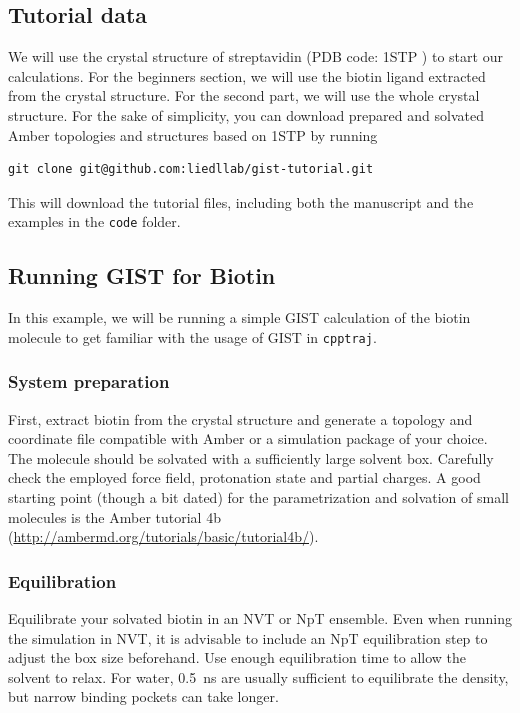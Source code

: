 \documentclass[9pt,tutorial]{livecoms}
\newcommand{\software}{\texttt}
\newcommand\inlinecode{\texttt}
\begin{document}
\subsection{Tutorial data}
We will use the crystal structure of streptavidin (PDB code: 1STP \cite{Weber1989-streptavidin-structure}) to start our calculations.
For the beginners section, we will use the biotin ligand extracted from the crystal structure.
For the second part, we will use the whole crystal structure.
For the sake of simplicity, you can download prepared and solvated Amber topologies and structures based on 1STP by running
\begin{lstlisting}[style=bash]
git clone git@github.com:liedllab/gist-tutorial.git
\end{lstlisting}
This will download the tutorial files, including both the manuscript and the examples in the \inlinecode{code} folder.

\subsection{Running GIST for Biotin}
In this example, we will be running a simple GIST calculation of the biotin molecule to get familiar with the usage of GIST in \software{cpptraj}.
\subsubsection{System preparation}
First, extract biotin from the crystal structure and generate a topology and coordinate file compatible with Amber or a simulation package of your choice.
The molecule should be solvated with a sufficiently large solvent box.
Carefully check the employed force field, protonation state and partial charges.
A good starting point (though a bit dated) for the parametrization and solvation of small molecules is the Amber tutorial 4b (\url{http://ambermd.org/tutorials/basic/tutorial4b/}).

\subsubsection{Equilibration}
Equilibrate your solvated biotin in an NVT or NpT ensemble.
Even when running the simulation in NVT, it is advisable to include an NpT equilibration step to adjust the box size beforehand.
Use enough equilibration time to allow the solvent to relax. 
For water, \SI{0.5}{\nano\second} are usually sufficient to equilibrate the density, but narrow binding pockets can take longer.
\end{document}
